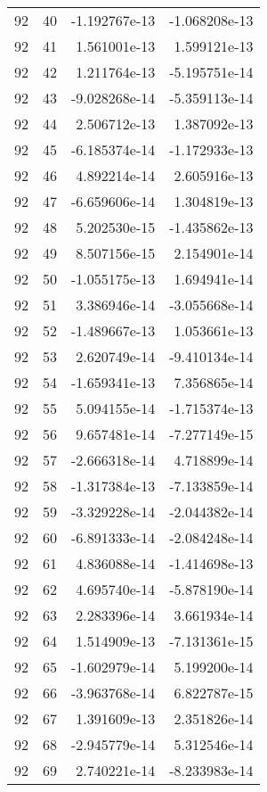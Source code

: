 \begin{tabular}{rrrr}
  92 &   40 & -1.192767e-13 & -1.068208e-13 \\
  92 &   41 &  1.561001e-13 &  1.599121e-13 \\
  92 &   42 &  1.211764e-13 & -5.195751e-14 \\
  92 &   43 & -9.028268e-14 & -5.359113e-14 \\
  92 &   44 &  2.506712e-13 &  1.387092e-13 \\
  92 &   45 & -6.185374e-14 & -1.172933e-13 \\
  92 &   46 &  4.892214e-14 &  2.605916e-13 \\
  92 &   47 & -6.659606e-14 &  1.304819e-13 \\
  92 &   48 &  5.202530e-15 & -1.435862e-13 \\
  92 &   49 &  8.507156e-15 &  2.154901e-14 \\
  92 &   50 & -1.055175e-13 &  1.694941e-14 \\
  92 &   51 &  3.386946e-14 & -3.055668e-14 \\
  92 &   52 & -1.489667e-13 &  1.053661e-13 \\
  92 &   53 &  2.620749e-14 & -9.410134e-14 \\
  92 &   54 & -1.659341e-13 &  7.356865e-14 \\
  92 &   55 &  5.094155e-14 & -1.715374e-13 \\
  92 &   56 &  9.657481e-14 & -7.277149e-15 \\
  92 &   57 & -2.666318e-14 &  4.718899e-14 \\
  92 &   58 & -1.317384e-13 & -7.133859e-14 \\
  92 &   59 & -3.329228e-14 & -2.044382e-14 \\
  92 &   60 & -6.891333e-14 & -2.084248e-14 \\
  92 &   61 &  4.836088e-14 & -1.414698e-13 \\
  92 &   62 &  4.695740e-14 & -5.878190e-14 \\
  92 &   63 &  2.283396e-14 &  3.661934e-14 \\
  92 &   64 &  1.514909e-13 & -7.131361e-15 \\
  92 &   65 & -1.602979e-14 &  5.199200e-14 \\
  92 &   66 & -3.963768e-14 &  6.822787e-15 \\
  92 &   67 &  1.391609e-13 &  2.351826e-14 \\
  92 &   68 & -2.945779e-14 &  5.312546e-14 \\
  92 &   69 &  2.740221e-14 & -8.233983e-14 \\

\end{tabular}
